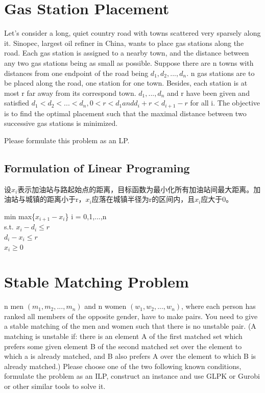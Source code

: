 \documentclass{article}
\begin{document}
\newpage
\section{Gas Station Placement}
Let's consider a long, quiet country road with towns scattered very sparsely along it. Sinopec, largest oil refiner in China, wants to place gas stations along the road. Each gas station is assigned to a nearby town, and the distance between any two gas stations being as small as possible. Suppose there are n towns with distances from one endpoint of the road being $d_1,d_2,... ,d_n$. n gas stations are to be placed along the road, one station for one town. Besides, each station is at most r far away from its correspond town. $d_1,...,d_n$ and r have been given and satisfied $d_1 < d_2 < ... < d_n, 0 < r < d_1 and d_i + r < d_{i+1} - r$ for all i. The objective is to find the optimal placement such that the maximal distance between two successive gas stations is minimized.

Please formulate this problem as an LP.




\subsection{Formulation of Linear Programing}
设$x_i$表示加油站与路起始点的距离，目标函数为最小化所有加油站间最大距离。加油站与城镇的距离小于r，$x_i$应落在城镇半径为r的区间内，且$x_i$应大于0。

\begin{center}
min max\{$x_{i+1}-x_i$\} i = 0,1,...,n\\
s.t. $x_i - d_i \leq r$\\
$d_i - x_i \leq r$\\
$x_i \geq 0$
\end{center} 


\newpage
\section{Stable Matching Problem }
n men $(m_1,m_2,... ,m_n)$ and n women $(w_1,w_2,... ,w_n)$, where each person has ranked all members of the opposite gender, have to make pairs. You need to give a stable matching of the men and women such that there is no unstable pair. (A matching is unstable if: there is an element A of the first matched set which prefers some given element B of the second matched set over the element to which a is already matched, and B also prefers A over the element to which B is already matched.) Please choose one of the two following known conditions, formulate the problem as an ILP, construct an instance and use GLPK or Gurobi or other similar tools to solve it. 
\end{document}
